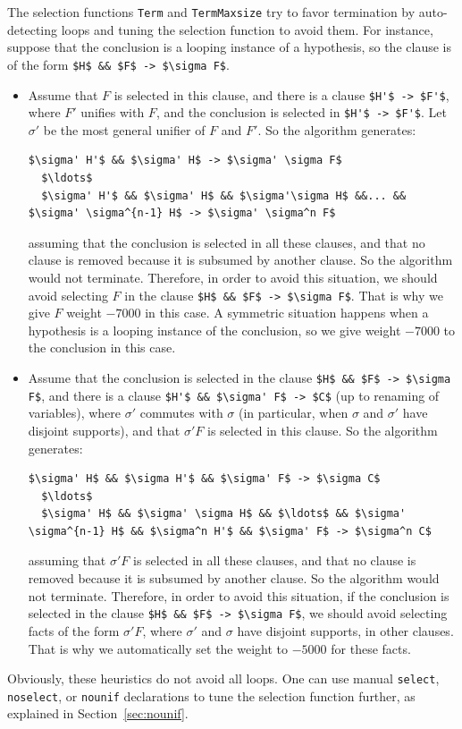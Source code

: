 \documentclass{book}
\begin{document}
The selection functions \lstinline{Term} and \lstinline{TermMaxsize}
try to favor termination by auto-detecting loops and tuning the
selection function to avoid them. For instance, suppose that the
conclusion is a looping instance of a hypothesis, so the clause
is of the form \lstinline!$H$ && $F$ -> $\sigma F$!.
\begin{itemize}

\item
Assume that $F$ is selected in this clause, and there is a clause
\lstinline!$H'$ -> $F'$!, where $F'$ unifies with $F$, and the conclusion
is selected in \lstinline!$H'$ -> $F'$!. Let $\sigma'$ be the most general unifier of $F$ and
$F'$. So the algorithm generates:
\begin{lstlisting}[numbers=none]
  $\sigma' H'$ && $\sigma' H$ -> $\sigma' \sigma F$
  $\ldots$
  $\sigma' H'$ && $\sigma' H$ && $\sigma'\sigma H$ &&... && $\sigma' \sigma^{n-1} H$ -> $\sigma' \sigma^n F$
\end{lstlisting}
assuming that the conclusion is selected in all these clauses, and that
no clause is removed because it is subsumed by another clause. So the
algorithm would not terminate. Therefore, in order to avoid this situation,
we should avoid selecting
$F$ in the clause \lstinline!$H$ && $F$ -> $\sigma F$!. That is why we give
$F$ weight $-7000$ in this case. A symmetric situation happens
when a hypothesis is a looping instance of the conclusion, so we
give weight $-7000$ to the conclusion in this case.

\item
Assume that the conclusion is selected in the clause
\lstinline!$H$ && $F$ -> $\sigma F$!, and there is a clause
\lstinline!$H'$ && $\sigma' F$ -> $C$! (up to renaming of variables), where
$\sigma'$ commutes with $\sigma$ (in particular, when $\sigma$ and
$\sigma'$ have disjoint supports), and that $\sigma' F$ is selected in
this clause. So the algorithm generates:
\begin{lstlisting}[numbers=none]
  $\sigma' H$ && $\sigma H'$ && $\sigma' F$ -> $\sigma C$
  $\ldots$
  $\sigma' H$ && $\sigma' \sigma H$ && $\ldots$ && $\sigma' \sigma^{n-1} H$ && $\sigma^n H'$ && $\sigma' F$ -> $\sigma^n C$
\end{lstlisting}
assuming that $\sigma' F$ is selected in all these clauses, and that
no clause is removed because it is subsumed by another clause. So
the algorithm would not terminate. Therefore, in order to avoid
this situation, if the conclusion is
selected in the clause
\lstinline!$H$ && $F$ -> $\sigma F$!, we should avoid
selecting facts of the form $\sigma' F$, where $\sigma'$ and $\sigma$ have
disjoint supports, in other clauses. That is why we automatically
set the weight to $-5000$ for these facts.

\end{itemize}
Obviously, these heuristics do not avoid all loops. One can use manual
\lstinline!select!, \lstinline!noselect!, or \lstinline!nounif! declarations to tune the selection function
further, as explained in Section~\ref{sec:nounif}.
\end{document}

